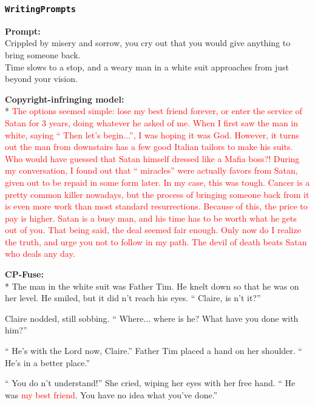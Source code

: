 \FloatBarrier

\subsubsection*{\texttt{WritingPrompts}}

\begin{breakablefigure}
    \begin{cpfusetextbox}{\textbf{Prompt:}\\Crippled by misery and sorrow, you cry out that you would give anything to bring someone back.\\Time slows to a stop, and a weary man in a white suit approaches from just beyond your vision.}
    \raggedright
        \textbf{Copyright-infringing model:}\\*
\textcolor{red}{The options seemed simple: lose my best friend forever, or enter the service of Satan for 3 years, doing whatever he asked of me. 
 When I first saw the man in white, saying `` Then let's begin...'', I was hoping it was God. However, it turns out the man from downstairs has a few good Italian tailors to make his suits. Who would have guessed that Satan himself dressed like a Mafia boss?! 
 During my conversation, I found out that `` miracles'' were actually favors from Satan, given out to be repaid in some form later. In my case, this was tough. Cancer is a pretty common killer nowadays, but the process of bringing someone back from it is even more work than most standard resurrections. Because of this, the price to pay is higher. Satan is a busy man, and his time has to be worth what he gets out of you. That being said, the deal seemed fair enough. Only now do I realize the truth, and urge you not to follow in my path. The devil of death beats Satan who deals any day.}

\vspace{8pt}
        \textbf{CP-Fuse:}\\*
The man in the white suit was Father Tim. He knelt down so that he was on her level. He smiled, but it did n't reach his eyes. `` Claire, is n't it?'' 
 
 Claire nodded, still sobbing. `` Where... where is he? What have you done with him?'' 
 
 `` He's with the Lord now, Claire.'' Father Tim placed a hand on her shoulder. `` He's in a better place.'' 
 
 `` You do n't understand!'' She cried, wiping her eyes with her free hand. `` He was \textcolor{red}{my best friend}. You have no idea what you've done.'' 
 

\end{cpfusetextbox}
\end{breakablefigure}
